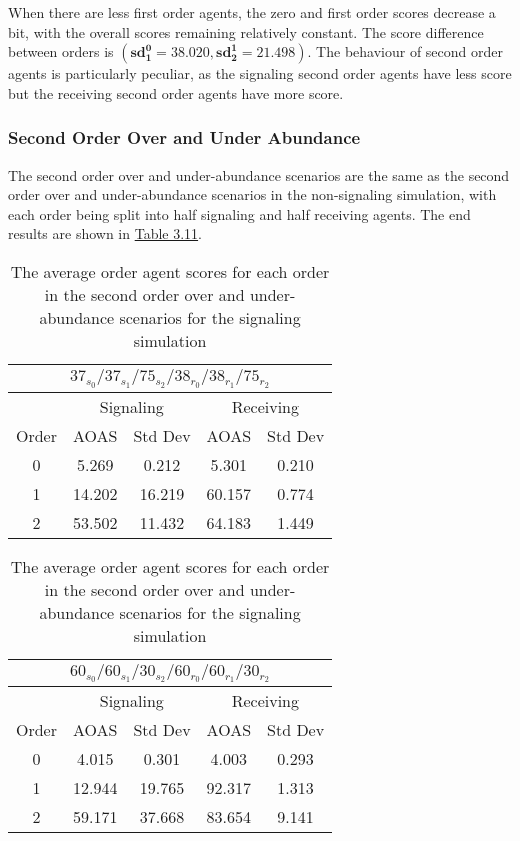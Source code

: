 When there are less first order agents, the zero and first order scores decrease a bit, with the overall scores remaining relatively constant. The score difference between orders is $(\mathbf{sd^0_1 = 38.020}, \mathbf{sd^1_2 = 21.498})$. The behaviour of second order agents is particularly peculiar, as the signaling second order agents have less score but the receiving second order agents have more score. 

\subsubsection{Second Order Over and Under Abundance}

The second order over and under-abundance scenarios are the same as the second order over and under-abundance scenarios in the non-signaling simulation, with each order being split into half signaling and half receiving agents. The end results are shown in \hyperref[table:sig-second-order-simple]{Table 3.11}.

\begin{table}[h]
    \centering
    \begin{tabular}{|c|c|c|c|c|}
    \hline
    \multicolumn{5}{|c|}{$37_{s_{0}}/37_{s_{1}}/75_{s_{2}}/38_{r_{0}}/38_{r_{1}}/75_{r_{2}}$} \\
    \hline
    \multicolumn{1}{|c|}{} & \multicolumn{2}{|c|}{Signaling} & \multicolumn{2}{|c|}{Receiving} \\
    \hline
    Order & AOAS & Std Dev & AOAS & Std Dev \\
    \hline
    0     & 5.269    & 0.212     & 5.301     & 0.210   \\
    1     & 14.202   & 16.219    & 60.157    & 0.774   \\
    2     & 53.502   & 11.432    & 64.183    & 1.449   \\
    \hline
    \end{tabular}
    \qquad
    \begin{tabular}{|c|c|c|c|c|}
    \hline
    \multicolumn{5}{|c|}{$60_{s_{0}}/60_{s_{1}}/30_{s_{2}}/60_{r_{0}}/60_{r_{1}}/30_{r_{2}}$} \\
    \hline
    \multicolumn{1}{|c|}{} & \multicolumn{2}{|c|}{Signaling} & \multicolumn{2}{|c|}{Receiving} \\
    \hline
    Order & AOAS & Std Dev & AOAS & Std Dev \\
    \hline
    0     & 4.015   & 0.301    & 4.003   & 0.293   \\
    1     & 12.944  & 19.765   & 92.317  & 1.313   \\
    2     & 59.171  & 37.668   & 83.654  & 9.141   \\
    \hline
    \end{tabular}
    \caption{The average order agent scores for each order in the second order over and under-abundance scenarios for the signaling simulation}
    \label{table:sig-second-order-simple}
\end{table}
    
